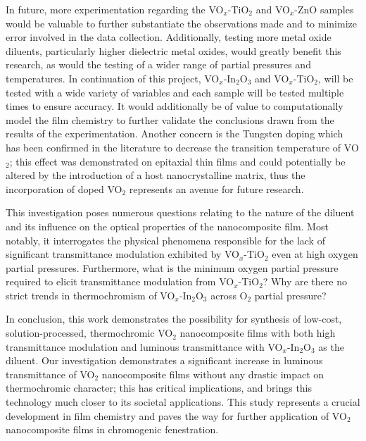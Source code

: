 \documentclass[a4paper]{article}
\begin{document}
In future, more experimentation regarding the VO$_x$-TiO$_2$ and VO$_x$-ZnO samples would be valuable to further substantiate the observations made and to minimize error involved in the data collection.  Additionally, testing more metal oxide diluents, particularly higher dielectric metal oxides, would greatly benefit this research, as would the testing of a wider range of partial pressures and temperatures. In continuation of this project, VO$_x$-In$_2$O$_3$ and VO$_x$-TiO$_2$, will be tested with a wide variety of variables and each sample will be tested multiple times to ensure accuracy. It would additionally be of value to computationally model the film chemistry to further validate the conclusions drawn from the results of the experimentation. Another concern is the Tungsten doping which has been confirmed in the literature to decrease the transition temperature of VO$_2$; this effect was demonstrated on epitaxial thin films and could potentially be altered by the introduction of a host nanocrystalline matrix, thus the incorporation of doped VO$_2$ represents an avenue for future research.

This investigation poses numerous questions relating to the nature of the diluent and its influence on the optical properties of the nanocomposite film. Most notably, it interrogates the physical phenomena responsible for the lack of significant transmittance modulation exhibited by VO$_x$-TiO$_2$ even at high oxygen partial pressures. Furthermore, what is the minimum oxygen partial pressure required to elicit transmittance modulation from VO$_x$-TiO$_2$? Why are there no strict trends in thermochromism of VO$_x$-In$_2$O$_3$ across O$_2$ partial pressure? 
    
In conclusion, this work demonstrates the possibility for synthesis of low-cost, solution-processed, thermochromic VO$_2$ nanocomposite films with both high transmittance modulation and luminous transmittance with VO$_x$-In$_2$O$_3$ as the diluent. Our investigation demonstrates a significant increase in luminous transmittance of VO$_2$ nanocomposite films without any drastic impact on thermochromic character; this has critical implications, and brings this technology much closer to its societal applications. This study represents a crucial development in film chemistry and paves the way for further application of VO$_2$ nanocomposite films in chromogenic fenestration.



\medskip
 
\end{document}
